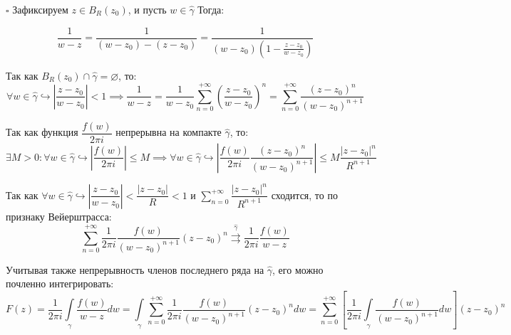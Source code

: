\documentclass[12pt, a4paper, reqno]{article}
\begin{document}
    $\square$ Зафиксируем $z \in B_{R}(z_0)$, и пусть $w \in \hat{\gamma}$ Тогда:

    \begin{equation*}
        \frac{1}{w - z} = \frac{1}{(w - z_0) - (z - z_0)} = \frac{1}{(w - z_0)(1 - \frac{z - z_0}{w - z_0})}
    \end{equation*}

    Так как $B_{R}(z_0) \cap \hat{\gamma} = \varnothing$, то:
    \begin{equation*}
        \forall w \in \hat{\gamma} \hookrightarrow \left|\frac{z - z_0}{w - z_0}\right| < 1 \implies
        \frac{1}{w - z} = \frac{1}{w - z_0}\sum\limits_{n = 0}^{+\infty} \left(\frac{z - z_0}{w - z_0}\right)^n =
        \sum\limits_{n = 0}^{+\infty} \frac{(z - z_0)^n}{(w - z_0)^{n + 1}}
    \end{equation*}

    Так как функция $\dfrac{f(w)}{2\pi i}$ непрерывна на компакте $\hat{\gamma}$, то:
    \begin{equation*}
        \exists M > 0: \forall w \in \hat{\gamma} \hookrightarrow
        \left|\frac{f(w)}{2\pi i}\right| \leq M \implies
        \forall w \in \hat{\gamma} \hookrightarrow
        \left|\frac{f(w)}{2\pi i}\frac{(z - z_0)^n}{(w - z_0)^{n + 1}}\right| \leq
        M\frac{|z - z_0|^n}{R^{n + 1}}
    \end{equation*}

    Так как $\forall w \in \hat{\gamma} \hookrightarrow \left|\dfrac{z - z_0}{w - z_0}\right| <
    \dfrac{|z - z_0|}{R} < 1$ и $\sum\limits_{n = 0}^{+\infty}\dfrac{|z - z_0|^n}{R^{n + 1}}$ сходится,
    то по признаку Вейерштрасса:
    \begin{equation*}
        \sum\limits_{n = 0}^{+\infty} \frac{1}{2\pi i}\frac{f(w)}{(w - z_0)^{n + 1}}(z - z_0)^n
        \overset{\hat{\gamma}}{\rightrightarrows} \frac{1}{2\pi i}\frac{f(w)}{w - z}
    \end{equation*}

    Учитывая также непрерывность членов последнего ряда на $\hat{\gamma}$, его можно почленно
    интегрировать:
    \begin{equation*}
        F(z) = \frac{1}{2\pi i}\int\limits_{\gamma}\frac{f(w)}{w - z}dw =
        \int\limits_{\gamma} \sum\limits_{n = 0}^{+\infty}
            \frac{1}{2\pi i}\frac{f(w)}{(w - z_0)^{n + 1}}(z - z_0)^n dw =
        \sum\limits_{n = 0}^{+\infty}
            \left[\frac{1}{2\pi i}\int\limits_{\gamma}\frac{f(w)}{(w - z_0)^{n + 1}}dw\right](z - z_0)^n
    \end{equation*}
\end{document}
